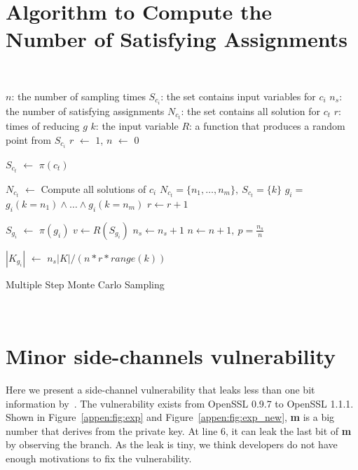 \section{Algorithm to Compute the Number of Satisfying Assignments}
\label{appendix:montecarlo}
~
{\small
\IncMargin{1em}
\begin{algorithm}\small
    \SetAlgoLined
    \DontPrintSemicolon


    $n$: the number of sampling times \;
    $S_{c_i}$: the set contains input variables for $c_{i}$ \;
    $n_{s}$: the number of satisfying assignments \;
    $N_{c_t}$: the set contains all solution for $c_t$ \;
    $r$: times of reducing $g$\;
    $k$: the input variable \;
    $R$: a function that produces a random point from $S_{c_i}$\;
    $r$ $\leftarrow$ $1$,
    $n$ $\leftarrow$ $0$ \;
     {
        $S_{c_t}$ $\leftarrow$ $\pi(c_t)$ \;
        {
            $N_{c_t}$ $\leftarrow$ Compute all solutions of $c_i$ \;
            $N_{c_t} = \{n_1, \ldots, n_m\},\ S_{c_t} = \{k\}  $ \;
            $g_{i} = $ $g_i(k=n_1) \land \ldots \land g_i(k=n_m)$ \;
            $r \leftarrow r+1$ \;

        }
    }
     {
        $S_{g_i}$ $\leftarrow$ $\pi(g_i)$ \;
        $v \leftarrow R(S_{g_i})$ 
        {
           $n_s \leftarrow n_s + 1$
        }
        $n \leftarrow n +1,\ p = \frac{n_s}{n}$
    }

    $|K_{g_{i}}|$ $\leftarrow$ $n_s|K| / (n * r * range(k))$
    \caption{Multiple Step Monte Carlo Sampling}
\end{algorithm}
\DecMargin{1em}
}
~\vvv

\clearpage
\section{Minor side-channels vulnerability}
\label{appendix:minor:vul}
Here we present a side-channel vulnerability that leaks
less than one bit information by~\tool{}. The vulnerability exists
from OpenSSL 0.9.7 to OpenSSL 1.1.1. Shown in Figure~\ref{appen:fig:exp} 
and Figure~\ref{appen:fig:exp_new}, \textbf{m} is a big number that
derives from the private key.
At line 6, it can leak the last bit of \textbf{m} by observing the branch. 
As the leak is tiny,
we think developers do not have enough motivations
to fix the vulnerability.

